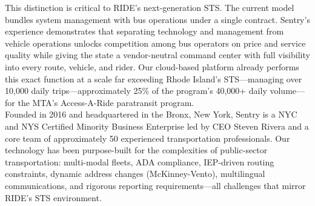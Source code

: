 This distinction is critical to RIDE's next-generation STS. The current model bundles system management with bus operations under a single contract. Sentry's experience demonstrates that separating technology and management from vehicle operations unlocks competition among bus operators on price and service quality while giving the state a vendor-neutral command center with full visibility into every route, vehicle, and rider. Our cloud-based platform already performs this exact function at a scale far exceeding Rhode Island's STS---managing over 10,000 daily trips---approximately 25\% of the program's 40,000+ daily volume---for the MTA's Access-A-Ride paratransit program.\\

Founded in 2016 and headquartered in the Bronx, New York, Sentry is a NYC and NYS Certified Minority Business Enterprise led by CEO Steven Rivera and a core team of approximately 50 experienced transportation professionals. Our technology has been purpose-built for the complexities of public-sector transportation: multi-modal fleets, ADA compliance, IEP-driven routing constraints, dynamic address changes (McKinney-Vento), multilingual communications, and rigorous reporting requirements---all challenges that mirror RIDE's STS environment.

